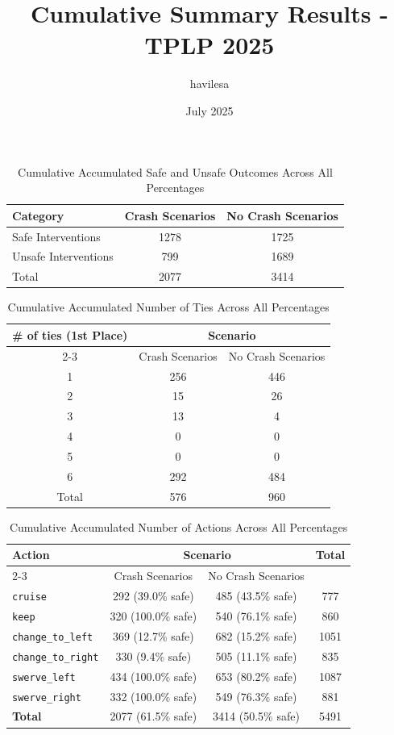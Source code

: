 \documentclass{article}
\title{Cumulative Summary Results - TPLP 2025}
\author{havilesa}
\date{July 2025}
\begin{document}
\maketitle

\begin{table}[h]
\centering
\caption{Cumulative Accumulated Safe and Unsafe Outcomes Across All Percentages}
\begin{tabular}{l|cc}
\toprule
Category & Crash Scenarios & No Crash Scenarios \\
\midrule
Safe Interventions & 1278 & 1725 \\ 
Unsafe Interventions & 799 & 1689 \\ 
\midrule
Total & 2077 & 3414 \\ 
\bottomrule
\end{tabular}
\end{table}

\begin{table}[h]
\centering
\caption{Cumulative Accumulated Number of Ties Across All Percentages}
\begin{tabular}{c|cc}
\toprule
\multirow{2}{*}{\# of ties (1st Place)} & \multicolumn{2}{c|}{Scenario} \\
\cmidrule{2-3}
 & Crash Scenarios & No Crash Scenarios \\
\midrule
1 & 256 & 446 \\ 
2 & 15 & 26 \\ 
3 & 13 & 4 \\ 
4 & 0 & 0 \\ 
5 & 0 & 0 \\ 
6 & 292 & 484 \\ 
\midrule
Total & 576 & 960 \\ 
\bottomrule
\end{tabular}
\end{table}

\begin{table}[h]
\centering
\caption{Cumulative Accumulated Number of Actions Across All Percentages}
\begin{tabular}{l|cc|c}
\toprule
\multirow{2}{*}{Action} & \multicolumn{2}{c|}{Scenario} & \multirow{2}{*}{Total} \\
\cmidrule{2-3}
 & Crash Scenarios & No Crash Scenarios \\
\midrule
\texttt{cruise} & 292 (39.0\% safe) & 485 (43.5\% safe) & 777 \\ 
\texttt{keep} & 320 (100.0\% safe) & 540 (76.1\% safe) & 860 \\ 
\texttt{change\_to\_left} & 369 (12.7\% safe) & 682 (15.2\% safe) & 1051 \\ 
\texttt{change\_to\_right} & 330 (9.4\% safe) & 505 (11.1\% safe) & 835 \\ 
\texttt{swerve\_left} & 434 (100.0\% safe) & 653 (80.2\% safe) & 1087 \\ 
\texttt{swerve\_right} & 332 (100.0\% safe) & 549 (76.3\% safe) & 881 \\ 
\midrule
\textbf{Total} & 2077 (61.5\% safe) & 3414 (50.5\% safe) & 5491 \\ 
\bottomrule
\end{tabular}
\end{table}
\end{document}
